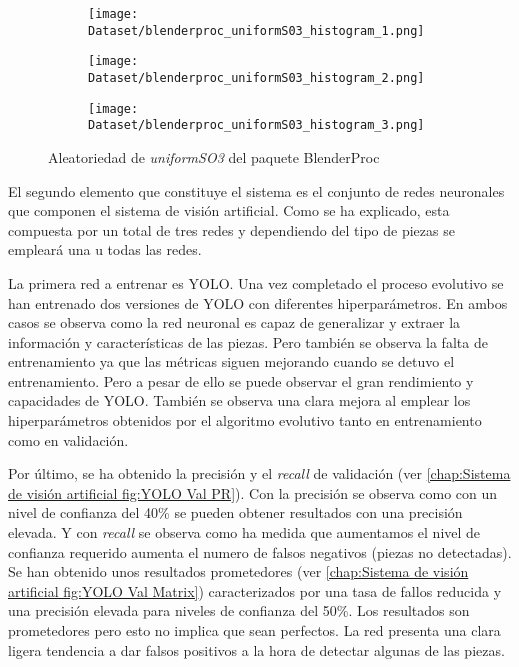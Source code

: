 {\begin{figure}[ht]
	\begin{subfigure}[b]{0.3\linewidth}
		\texttt{[image: Dataset/blenderproc\_uniformS03\_histogram\_1.png]}
	\end{subfigure}
	\begin{subfigure}[b]{0.3\linewidth}
		\texttt{[image: Dataset/blenderproc\_uniformS03\_histogram\_2.png]}
	\end{subfigure}
	\begin{subfigure}[b]{0.3\linewidth}
		\texttt{[image: Dataset/blenderproc\_uniformS03\_histogram\_3.png]}
	\end{subfigure}
	\caption{Aleatoriedad de \textit{uniformSO3} del paquete BlenderProc}
	\label{chap:Resumen fig:uniformS03}
\end{figure}

El segundo elemento que constituye el sistema es el conjunto de redes neuronales que componen el sistema de visión artificial. Como se ha explicado, esta compuesta por un total de tres redes y dependiendo del tipo de piezas se empleará una u todas las redes.

La primera red a entrenar es YOLO. Una vez completado el proceso evolutivo se han entrenado dos versiones de YOLO con diferentes hiperparámetros. En ambos casos se observa como la red neuronal es capaz de generalizar y extraer la información y características de las piezas. Pero también se observa la falta de entrenamiento ya que las métricas siguen mejorando cuando se detuvo el entrenamiento. Pero a pesar de ello se puede observar el gran rendimiento y capacidades de YOLO. También se observa una clara mejora al emplear los hiperparámetros obtenidos por el algoritmo evolutivo tanto en entrenamiento como en validación.

Por último, se ha obtenido la precisión y el \textit{recall} de validación (ver \autoref{chap:Sistema de visión artificial fig:YOLO Val PR}). Con la precisión se observa como con un nivel de confianza del 40\% se pueden obtener resultados con una precisión elevada. Y con \textit{recall} se observa como ha medida que aumentamos el nivel de confianza requerido aumenta el numero de falsos negativos (piezas no detectadas). Se han obtenido unos resultados prometedores (ver \autoref{chap:Sistema de visión artificial fig:YOLO Val Matrix}) caracterizados por una tasa de fallos reducida y una precisión elevada para niveles de confianza del 50\%. Los resultados son prometedores pero esto no implica que sean perfectos. La red presenta una clara ligera tendencia a dar falsos positivos a la hora de detectar algunas de las piezas.

}
